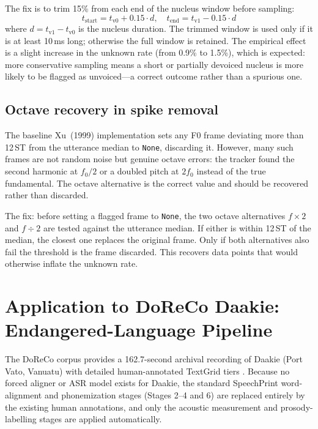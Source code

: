 The fix is to trim 15\% from each end of the nucleus window before sampling:
\begin{equation}
  t_{\mathrm{start}} = t_{\mathrm{v0}} + 0.15 \cdot d, \quad
  t_{\mathrm{end}}   = t_{\mathrm{v1}} - 0.15 \cdot d
\end{equation}
where $d = t_{\mathrm{v1}} - t_{\mathrm{v0}}$ is the nucleus duration. The
trimmed window is used only if it is at least 10\,ms long; otherwise the full
window is retained. The empirical effect is a slight increase in the unknown
rate (from 0.9\% to 1.5\%), which is expected: more conservative sampling means
a short or partially devoiced nucleus is more likely to be flagged as
unvoiced---a correct outcome rather than a spurious one.

\subsection{Octave recovery in spike removal}

The baseline Xu~(1999) implementation sets any F0 frame deviating more than
12\,ST from the utterance median to \texttt{None}, discarding it. However, many
such frames are not random noise but genuine octave errors: the tracker found
the second harmonic at $f_0 / 2$ or a doubled pitch at $2f_0$ instead of the
true fundamental. The octave alternative is the correct value and should be
recovered rather than discarded.

The fix: before setting a flagged frame to \texttt{None}, the two octave
alternatives $f \times 2$ and $f \div 2$ are tested against the utterance
median. If either is within 12\,ST of the median, the closest one replaces the
original frame. Only if both alternatives also fail the threshold is the frame
discarded. This recovers data points that would otherwise inflate the unknown
rate.

\section{Application to DoReCo Daakie: Endangered-Language Pipeline}
\label{sec:doreco_pipeline}

The DoReCo corpus provides a 162.7-second archival recording of Daakie (Port
Vato, Vanuatu) with detailed human-annotated TextGrid tiers \cite{seifart2022doreco}.
Because no forced aligner or ASR model exists for Daakie, the standard
SpeechPrint word-alignment and phonemization stages (Stages 2--4 and 6) are
replaced entirely by the existing human annotations, and only the acoustic
measurement and prosody-labelling stages are applied automatically.

